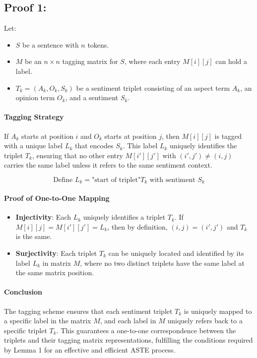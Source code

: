 \documentclass[11pt]{article}
\begin{document}
\subsection{Proof 1: }
\begin{adjustwidth}{0.9em}{0pt}
Let:
\begin{itemize}
    \item \( S \) be a sentence with \( n \) tokens.
    \item \( M \) be an \( n \times n \) tagging matrix for \( S \), where each entry \( M[i][j] \) can hold a label.
    \item \( T_k = (A_k, O_k, S_k) \) be a sentiment triplet consisting of an aspect term \( A_k \), an opinion term \( O_k \), and a sentiment \( S_k \).
\end{itemize}

\paragraph{Tagging Strategy}
If \( A_k \) starts at position \( i \) and \( O_k \) starts at position \( j \), then \( M[i][j] \) is tagged with a unique label \( L_k \) that encodes \( S_k \). This label \( L_k \) uniquely identifies the triplet \( T_k \), ensuring that no other entry \( M[i'][j'] \) with \( (i', j') \neq (i, j) \) carries the same label unless it refers to the same sentiment context.

\[
\text{Define } L_k = \text{"start of triplet"} T_k \text{ with sentiment } S_k
\]

\paragraph{Proof of One-to-One Mapping}
\begin{itemize}
    \item \textbf{Injectivity}: Each \( L_k \) uniquely identifies a triplet \( T_k \). If \( M[i][j] = M[i'][j'] = L_k \), then by definition, \( (i, j) = (i', j') \) and \( T_k \) is the same.
    \item \textbf{Surjectivity}: Each triplet \( T_k \) can be uniquely located and identified by its label \( L_k \) in matrix \( M \), where no two distinct triplets have the same label at the same matrix position.
\end{itemize}

\paragraph{Conclusion}
The tagging scheme ensures that each sentiment triplet \( T_k \) is uniquely mapped to a specific label in the matrix \( M \), and each label in \( M \) uniquely refers back to a specific triplet \( T_k \). This guarantees a one-to-one correspondence between the triplets and their tagging matrix representations, fulfilling the conditions required by Lemma 1 for an effective and efficient ASTE process.

\end{adjustwidth}
\end{document}
